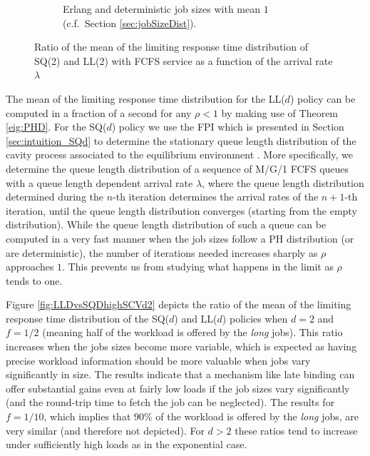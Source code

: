 \documentclass[12pt]{report}
\begin{document}
\begin{figure}[t]
\begin{center}
\begin{subfigure}{.45\textwidth}
\caption{Erlang and deterministic job sizes with mean $1$ (c.f.~Section \ref{sec:jobSizeDist}).}
\label{fig:LLDvsSQDlowSCVd2}
\end{subfigure}
\caption{Ratio of the mean of the limiting response time distribution of SQ(2) and LL(2) with FCFS service as a function of the arrival rate $\lambda$}
\label{fig:ER_ratio_ifo_lam_LLd}
\end{center}
\end{figure}

The mean of the limiting response time distribution for the LL($d$) policy can be computed in a fraction of a second for any $\rho < 1$
by making use of Theorem \ref{eig:PHD}. For the SQ($d$) policy we use the FPI which is presented in Section \ref{sec:intuition_SQd} to determine the stationary queue length distribution of the cavity process associated to the
equilibrium environment \cite{bramsonLB}. More specifically, we determine the queue length distribution 
of a sequence of M/G/1 FCFS queues with a queue length dependent arrival rate $\lambda$,
where the queue length distribution determined during the $n$-th iteration determines the
arrival rates of the $n+1$-th iteration, until the queue length distribution converges (starting from the empty distribution). 
While the queue length distribution of such a queue can be computed in a very fast manner when the job
sizes follow a PH distribution (or are deterministic), the number of iterations
needed increases sharply as $\rho$ approaches $1$. 
This prevents us from studying what happens in the limit as $\rho$ tends to one.


Figure \ref{fig:LLDvsSQDhighSCVd2} depicts the ratio of the mean of the limiting response time distribution
of the SQ($d$) and LL($d$) policies when $d=2$ and $f=1/2$ (meaning half of the workload is offered by the {\it long} jobs). 
This ratio increases when the jobs sizes become more variable, which is expected
as having precise workload information should be more valuable when jobs vary significantly in size. 
The results indicate that a mechanism like late binding can offer substantial gains even at fairly low loads
if the job sizes vary significantly (and the round-trip time to fetch the job can be neglected).
The results for $f=1/10$, which implies that $90\%$ of the workload is offered by the {\it long} jobs, 
are very similar (and therefore not depicted). For $d>2$ these ratios tend to increase under sufficiently high loads 
as in the exponential case.
\end{document}
